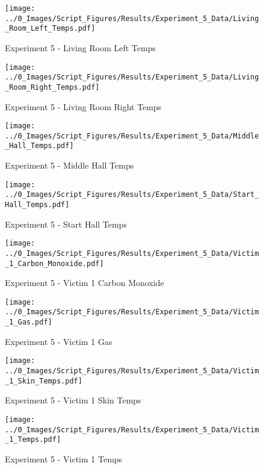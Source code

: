 	\begin{figure}[H]
		\centering
		\texttt{[image: ../0\_Images/Script\_Figures/Results/Experiment\_5\_Data/Living\_Room\_Left\_Temps.pdf]}
		\caption[]{Experiment 5 - Living Room Left Temps}
	\end{figure}
 
	\clearpage

	\begin{figure}[H]
		\centering
		\texttt{[image: ../0\_Images/Script\_Figures/Results/Experiment\_5\_Data/Living\_Room\_Right\_Temps.pdf]}
		\caption[]{Experiment 5 - Living Room Right Temps}
	\end{figure}
 

	\begin{figure}[H]
		\centering
		\texttt{[image: ../0\_Images/Script\_Figures/Results/Experiment\_5\_Data/Middle\_Hall\_Temps.pdf]}
		\caption[]{Experiment 5 - Middle Hall Temps}
	\end{figure}
 
	\clearpage

	\begin{figure}[H]
		\centering
		\texttt{[image: ../0\_Images/Script\_Figures/Results/Experiment\_5\_Data/Start\_Hall\_Temps.pdf]}
		\caption[]{Experiment 5 - Start Hall Temps}
	\end{figure}
 

	\begin{figure}[H]
		\centering
		\texttt{[image: ../0\_Images/Script\_Figures/Results/Experiment\_5\_Data/Victim\_1\_Carbon\_Monoxide.pdf]}
		\caption[]{Experiment 5 - Victim 1 Carbon Monoxide}
	\end{figure}
 
	\clearpage

	\begin{figure}[H]
		\centering
		\texttt{[image: ../0\_Images/Script\_Figures/Results/Experiment\_5\_Data/Victim\_1\_Gas.pdf]}
		\caption[]{Experiment 5 - Victim 1 Gas}
	\end{figure}
 

	\begin{figure}[H]
		\centering
		\texttt{[image: ../0\_Images/Script\_Figures/Results/Experiment\_5\_Data/Victim\_1\_Skin\_Temps.pdf]}
		\caption[]{Experiment 5 - Victim 1 Skin Temps}
	\end{figure}
 
	\clearpage

	\begin{figure}[H]
		\centering
		\texttt{[image: ../0\_Images/Script\_Figures/Results/Experiment\_5\_Data/Victim\_1\_Temps.pdf]}
		\caption[]{Experiment 5 - Victim 1 Temps}
	\end{figure}
 

